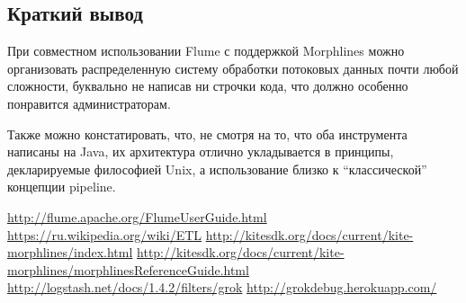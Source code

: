 \documentclass[10pt, a5paper]{article}
\begin{document}
%
%
%
%
\subsection*{Краткий вывод}

При совместном использовании Flume с поддержкой Morphlines можно организовать распределенную систему обработки потоковых данных почти любой сложности, буквально не написав ни строчки кода, что должно особенно понравится администраторам.

Также можно констатировать, что, не смотря на то, что оба инструмента написаны на Java, их архитектура отлично укладывается в принципы, декларируемые философией Unix, а использование близко к ``классической'' концепции pipeline.
\begin{thebibliography}{9}
 \url{http://flume.apache.org/FlumeUserGuide.html} 
 \url{https://ru.wikipedia.org/wiki/ETL} 
 \url{http://kitesdk.org/docs/current/kite-morphlines/index.html} 
 \url{http://kitesdk.org/docs/current/kite-morphlines/morphlinesReferenceGuide.html} 
 \url{http://logstash.net/docs/1.4.2/filters/grok} 
 \url{http://grokdebug.herokuapp.com/}
\end{thebibliography}
\end{document}
